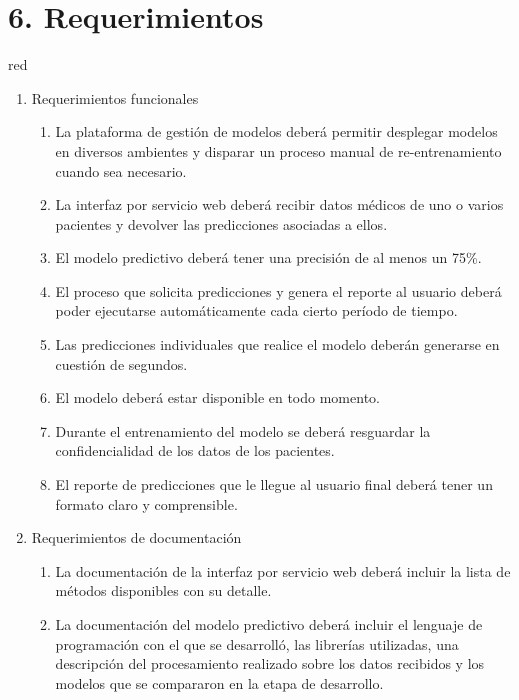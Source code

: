 \documentclass[
11pt, %
]{charter}
\begin{document}
\section{6. Requerimientos}
\label{sec:requerimientos}

\begin{consigna}{red}

\begin{enumerate}
	\item Requerimientos funcionales
		\begin{enumerate}
			\item La plataforma de gestión de modelos deberá permitir desplegar modelos en diversos ambientes y disparar un proceso manual de re-entrenamiento cuando sea necesario.
			\item La interfaz por servicio web deberá recibir datos médicos de uno o varios pacientes y devolver las predicciones asociadas a ellos.			
			\item El modelo predictivo deberá tener una precisión de al menos un 75\%.
			\item El proceso que solicita predicciones y genera el reporte al usuario deberá poder ejecutarse automáticamente cada cierto período de tiempo.		
			\item Las predicciones individuales que realice el modelo deberán generarse en cuestión de segundos.
			\item El modelo	deberá estar disponible en todo momento.
			\item Durante el entrenamiento del modelo se deberá resguardar la confidencialidad de los datos de los pacientes.
			\item El reporte de predicciones que le llegue al usuario final deberá tener un formato claro y comprensible.
		\end{enumerate}
	\item Requerimientos de documentación
		\begin{enumerate}
			\item La documentación de la interfaz por servicio web deberá incluir la lista de métodos disponibles con su detalle.
			\item La documentación del modelo predictivo deberá incluir el lenguaje de programación con el que se desarrolló, las librerías utilizadas, una descripción del procesamiento realizado sobre los datos recibidos y los modelos que se compararon en la etapa de desarrollo.
		\end{enumerate}
\end{enumerate}

\end{consigna}
\end{document}
